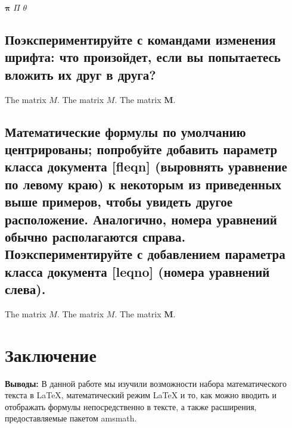 \documentclass[leqno]{article}
\begin{document}
  \begin{center}
    $\mathbf{\pi}$
    $\Pi$
    $\theta$
  \end{center}


  \subsection{Поэкспериментируйте с командами изменения шрифта: что произойдет, если вы попытаетесь вложить их друг в друга?}
  \label{subsec:font}

  \begin{center}
    The matrix $\mathit{M}$.
    The matrix $\mathbf{\mathit{M}}$.
    The matrix $\mathbf{M}$.
  \end{center}

  \subsection{Математические формулы по умолчанию центрированы; попробуйте добавить параметр класса документа
[fleqn] (выровнять уравнение по левому краю) к некоторым из приведенных выше примеров, 
чтобы увидеть другое расположение. Аналогично, номера уравнений обычно располагаются справа.
 Поэкспериментируйте с добавлением параметра класса документа [leqno] (номера уравнений слева).}
  \label{subsec:experm}

  \begin{center}
    The matrix $\mathit{M}$.
    The matrix $\mathbf{\mathit{M}}$.
    The matrix $\mathbf{M}$.
  \end{center}
  
  \section{Заключение}
  \label{sec:conclusion}
  
  \textbf{Выводы:} В данной работе мы изучили возможности набора математического текста в LaTeX, математический режим LaTeX и то, как можно вводить и отображать формулы непосредственно в тексте, а также расширения, предоставляемые пакетом amsmath.
\end{document}
